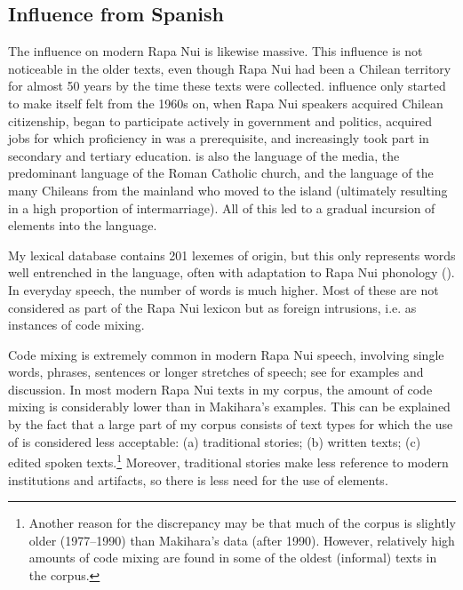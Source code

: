 \subsection{Influence from Spanish}\label{sec:1.4.2}

The  influence on modern Rapa Nui is likewise massive. This influence is not noticeable in the older texts, even though Rapa Nui had been a Chilean territory for almost 50 years by the time these texts were collected.  influence only started to make itself felt from the 1960s on, when Rapa Nui speakers acquired Chilean citizenship, began to participate actively in government and politics, acquired jobs for which proficiency in  was a prerequisite, and increasingly took part in secondary and tertiary education.  is also the language of the media, the predominant language of the Roman Catholic church, and the language of the many Chileans from the mainland who moved to the island (ultimately resulting in a high proportion of intermarriage). All of this led to a gradual incursion of  elements into the language. 

My lexical database contains 201 lexemes of  origin, but this only represents words well entrenched in the language, often with adaptation to Rapa Nui phonology (). In everyday speech, the number of  words is much higher. Most of these are not considered as part of the Rapa Nui lexicon but as foreign intrusions, i.e. as instances of code mixing. 

Code mixing is extremely common in modern Rapa Nui speech, involving single words, phrases, sentences or longer stretches of speech; see \citet{Makihara2001Changing,Makihara2001Adaptation,Makihara2004,Makihara2007,Makihara2009} for examples and discussion. In most modern Rapa Nui texts in my corpus, the amount of code mixing is considerably lower than in Makihara’s examples. This can be explained by the fact that a large part of my corpus consists of text types for which the use of  is considered less acceptable: (a) traditional stories; (b) written texts; (c) edited spoken texts.\footnote{\label{fn:20}Another reason for the discrepancy may be that much of the corpus is slightly older (1977–1990) than Makihara’s data (after 1990). However, relatively high amounts of code mixing are found in some of the oldest (informal) texts in the corpus.} Moreover, traditional stories make less reference to modern institutions and artifacts, so there is less need for the use of  elements.

